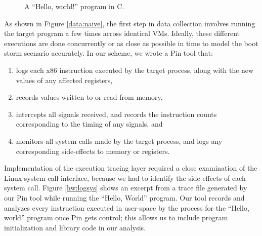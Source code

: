 \begin{figure}[h]
  
  \caption[A ``Hello, world!'' program in C.]%
          {A ``Hello, world!'' program in C. }
          \label{source:hw}
\end{figure}

 \newline
As shown in Figure \ref{data:naive}, the first step
in data collection involves running the target program
a few times across identical VMs. Ideally, these 
different executions are done concurrently or as
close as possible in time to model the boot storm scenario accurately. 
In our scheme, we wrote a Pin tool that:
\begin{enumerate}
\item logs each x86 instruction executed by 
  the target process, along with the 
  new values of any affected registers, 
\item records values written to or 
  read from memory,
\item intercepts all signals received, and records the instruction counts 
  corresponding to the timing of any signals, and
\item monitors all system calls made by the target process,
  and logs any corresponding side-effects to memory or registers.
\end{enumerate}

Implementation of the execution tracing layer required
a close examination of the Linux system call interface,
because we had to identify the side-effects of each system call. 
Figure \ref{hw:logsys} shows an excerpt from a trace file
generated by our Pin tool while running the ``Hello, World'' 
program. Our tool records and analyzes
every instruction executed in user-space by the process
for the ``Hello, world'' program once Pin gets control; 
this allows us to include program initialization
and library code in our analysis.

